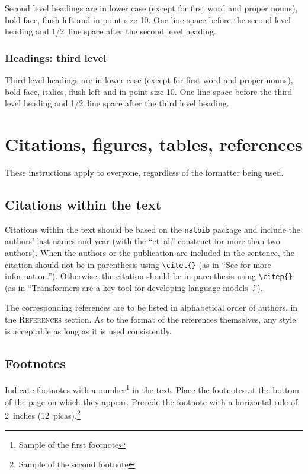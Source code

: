 \documentclass{article} %
\begin{document}
Second level headings are in lower case (except for first word and proper nouns), bold face,
flush left and in point size 10. One line space before the second level
heading and 1/2~line space after the second level heading.

\subsubsection{Headings: third level}

Third level headings are in lower case (except for first word and proper nouns), bold face, italics, 
flush left and in point size 10. One line space before the third level
heading and 1/2~line space after the third level heading.

\section{Citations, figures, tables, references}\label{others}

These instructions apply to everyone, regardless of the formatter being used.

\subsection{Citations within the text}

Citations within the text should be based on the \texttt{natbib} package
and include the authors' last names and year (with the ``et~al.'' construct
for more than two authors). When the authors or the publication are
included in the sentence, the citation should not be in parenthesis using \verb|\citet{}| (as
in ``See \citet{Vaswani+2017} for more information.''). Otherwise, the citation
should be in parenthesis using \verb|\citep{}| (as in ``Transformers are a key tool
for developing language models~\citep{Vaswani+2017}.'').

The corresponding references are to be listed in alphabetical order of
authors, in the \textsc{References} section. As to the format of the
references themselves, any style is acceptable as long as it is used
consistently.

\subsection{Footnotes}

Indicate footnotes with a number\footnote{Sample of the first footnote} in the
text. Place the footnotes at the bottom of the page on which they appear.
Precede the footnote with a horizontal rule of 2~inches
(12~picas).\footnote{Sample of the second footnote}
\end{document}
